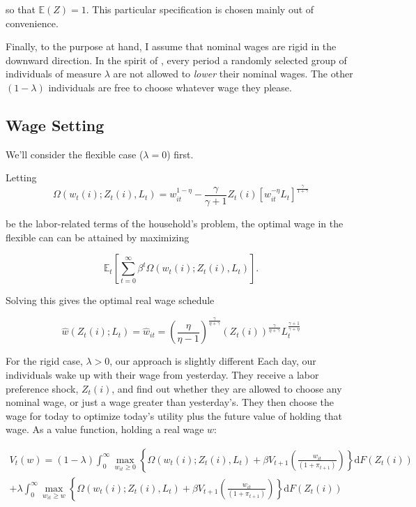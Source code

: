 \documentclass[12pt,a4paper]{scrartcl}            %
\begin{document}
so that $\mathbb{E}(Z) = 1$.
This particular specification is chosen mainly out of convenience.

Finally, to the purpose at hand, I assume that nominal wages are rigid in the downward direction.
In the spirit of \cite{calvo_1983}, every period a randomly selected group of individuals of measure $\lambda$ are not allowed to \emph{lower} their nominal wages.
The other $(1 - \lambda)$ individuals are free to choose whatever wage they please.
\subsection{Wage Setting}
\label{sub:wage_setting}

We'll consider the flexible case ($\lambda = 0$) first.

Letting
\begin{equation}
    \label{eq:labor_part}
    \Omega( w_t(i); Z_t(i), L_t ) = w_{it}^{1 - \eta} - \frac{\gamma}{\gamma + 1}Z_t(i)\left[ w_{it}^{-\eta}L_t \right]^{\frac{\gamma}{1 + \gamma}}
\end{equation}

be the labor-related terms of the household's problem, the optimal wage in the flexible can can be attained by maximizing

\begin{equation}
    \label{eq:labor_opt}
    \mathbb{E}_t\left[\sum_{t=0}^{\infty}\beta^t \Omega( w_t(i); Z_t(i), L_t ) \right].
\end{equation}

Solving this gives the optimal real wage schedule

\begin{equation}
    \label{eq:flex}
    \hat{w}(Z_t(i); L_t) = \hat{w}_{it} = \left( \frac{\eta}{\eta - 1} \right)^{\frac{\gamma}{\eta + \gamma}}\left( Z_t(i) \right)^{\frac{\gamma}{\eta + \gamma}} L_t^{\frac{\gamma + 1}{\gamma + \eta}}
\end{equation}

For the rigid case, $\lambda > 0$, our approach is slightly different
Each day, our individuals wake up with their wage from yesterday.
They receive a labor preference shock, $Z_t(i)$, and find out whether they are allowed to choose any nominal wage, or just a wage greater than yesterday's.
They then choose the wage for today to optimize today's utility plus the future value of holding that wage.
As a value function, holding a real wage $w$:

\begin{multline}
    \label{eq:value_function}
    V_t(w) = (1 - \lambda) \int_{0}^{\infty} \max_{w_{it} \geq 0} \left\{ \Omega( w_t(i); Z_t(i), L_t ) + \beta V_{t+1}\left( \frac{w_{it}}{(1 + \pi_{t+1})} \right) \right\} \mathrm{d}F(Z_t(i)) \\
                + \lambda  \int_{0}^{\infty} \max_{w_{it} \geq w} \left\{ \Omega( w_t(i); Z_t(i), L_t ) + \beta V_{t+1}\left( \frac{w_{it}}{(1 + \pi_{t+1})} \right) \right\} \mathrm{d}F(Z_t(i))
\end{multline}
\end{document}
